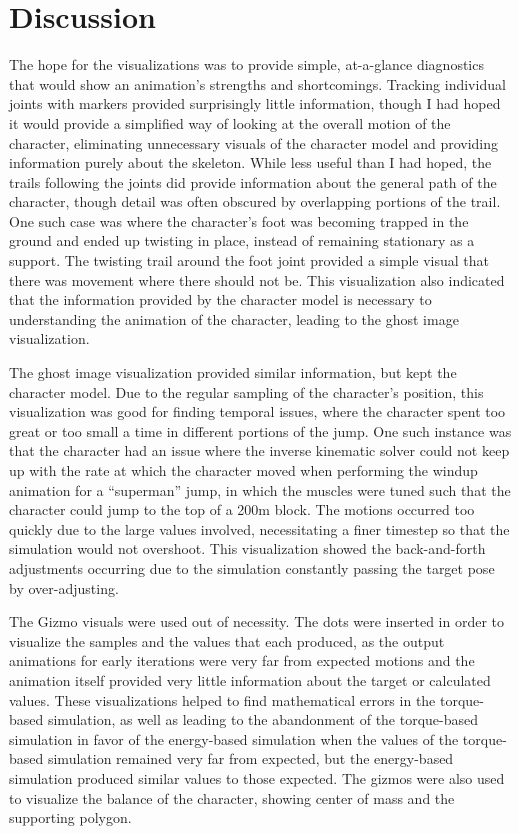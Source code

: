 \begin{figure}[ht]
	\label{fig:gizmo_vis}
\end{figure}

\section{Discussion}
\label{section:vis_discussion}
The hope for the visualizations was to provide simple, at-a-glance diagnostics that would show an animation's strengths and shortcomings.  Tracking individual joints with markers provided surprisingly little information, though I had hoped it would provide a simplified way of looking at the overall motion of the character, eliminating unnecessary visuals of the character model and providing information purely about the skeleton.  While less useful than I had hoped, the trails following the joints did provide information about the general path of the character, though detail was often obscured by overlapping portions of the trail. One such case was where the character's foot was becoming trapped in the ground and ended up twisting in place, instead of remaining stationary as a support.  The twisting trail around the foot joint provided a simple visual that there was movement where there should not be.  This visualization also indicated that the information provided by the character model is necessary to understanding the animation of the character, leading to the ghost image visualization.

The ghost image visualization provided similar information, but kept the character model.   Due to the regular sampling of the character's position, this visualization was good for finding temporal issues, where the character spent too great or too small a time in different portions of the jump.  One such instance was that the character had an issue where the inverse kinematic solver could not keep up with the rate at which the character moved when performing the windup animation for a ``superman'' jump, in which the muscles were tuned such that the character could jump to the top of a 200m block.  The motions occurred too quickly due to the large values involved, necessitating a finer timestep so that the simulation would not overshoot.  This visualization showed the back-and-forth adjustments occurring due to the simulation constantly passing the target pose by over-adjusting.

The Gizmo visuals were used out of necessity.  The dots were inserted in order to visualize the samples and the values that each produced, as the output animations for early iterations were very far from expected motions and the animation itself provided very little information about the target or calculated values.  These visualizations helped to find mathematical errors in the torque-based simulation, as well as leading to the abandonment of the torque-based simulation in favor of the energy-based simulation when the values of the torque-based simulation remained very far from expected, but the energy-based simulation produced similar values to those expected.  The gizmos were also used to visualize the balance of the character, showing center of mass and the supporting polygon.

